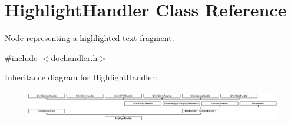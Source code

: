 \hypertarget{class_highlight_handler}{}\section{Highlight\+Handler Class Reference}
\label{class_highlight_handler}


Node representing a highlighted text fragment.  




{\ttfamily \#include $<$dochandler.\+h$>$}

Inheritance diagram for Highlight\+Handler\+:\begin{figure}[H]
\begin{center}
\leavevmode
\includegraphics[height=1.415929cm]{class_highlight_handler}
\end{center}
\end{figure}
